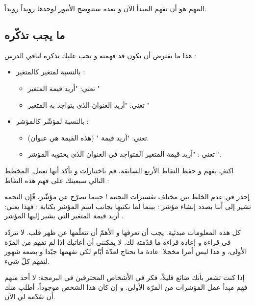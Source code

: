 المهم هو أن تفهم المبدأ الآن و بعده ستتوضح الأمور لوحدها رويداً رويداً.

\subsection{ما يجب تذكّره}
هذا ما يفترض أن تكون قد فهمته و يجب عليك تذكره لباقي الدرس :
\begin{itemize}
	\item بالنسبة لمتغير كالمتغير
 :
	\begin{itemize}
		\item {} تعني: "أريد قيمة المتغير
"
		\item {}
تعني: "أريد العنوان الذي يتواجد به المتغير
"
	\end{itemize}
	\item بالنسبة لمؤشّر كالمؤشر
 :
	\begin{itemize}
		\item {}
تعني: "أريد قيمة
"
(هذه القيمة هي عنوان).
		\item {}
تعني : "أريد قيمة المتغير المتواجد في العنوان الذي يحتويه المؤشر
".
	\end{itemize}
\end{itemize}
اكتفِ بفهم و حفظ النقاط الأربع السابقة، قم باختبارات و تأكد أنها تعمل. المخطط التالي سيعينك على فهم هذه النقاط :
\begin{warning}
إحذر في عدم الخلط بين مختلف تفسيرات النجمة ! حينما تصرّح عن مؤشّر، فّإن النجمة تشير إلى أننا بصدد إنشاء مؤشر :
بينما لما نكتبها بجانب اسم المؤشر بكتابة :
فهذا يعني: أريد قيمة المتغير التي يشير إليها المؤشر
.
\end{warning}
كل هذه المعلومات مبدئية. يجب أن تعرفها و الأهمّ أن تتعلّمها عن ظهر قلب. لا تتردّد في قراءة و إعادة قراءة ما قدّمته لك. لا يمكنني أن أعاتبك إذا لم تفهم من المرّة الأولى، و هذا ليس أمرا مخجلا. عادة ما تحتاج لعدّة أيّام لكي تفهمها جيّدا و بضعة شهور لتفهم كلّ شيء.

إذا كنت تشعر بأنك ضائع قليلاً، فكر في الأشخاص المحترفين في البرمجة:  لا أحد منهم فهم مبدأ عمل المؤشرات من المرّة الأولى. و إن كان هذا الشخص موجوداً، أطلب منك أن تقدّمه لي الآن.

